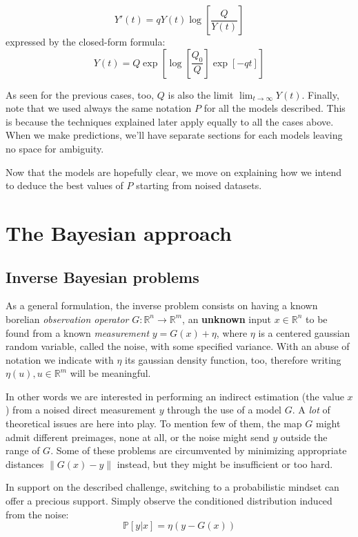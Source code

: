 \documentclass[9pt]{article}
\newcommand{\norm}[1]{\left\lVert#1\right\rVert}
\begin{document}
\begin{equation}
 Y'(t) = q Y(t) \log \left [\frac{Q} {Y(t)} \right ]
\end{equation}
expressed by the closed-form formula:
\begin{equation}
Y(t) = Q \exp	\left [
	\log \left [ \frac{Q_0}{Q} \right ]
	\exp \left [ -q t \right ]
		\right ]
\end{equation} 


As seen for the previous cases, too, $Q$ is also the limit
$\lim_{t \to \infty} Y(t)$.
Finally, note that we used always the same notation $P$ for all the models
described. This is because the techniques explained later apply equally
to all the cases above. When we make predictions, we'll have separate sections
for each models leaving no space for ambiguity.


Now that the models are hopefully clear, we move on explaining how we
intend to deduce the best values of $P$ starting from noised datasets.

\section {The Bayesian approach}
\subsection {Inverse Bayesian problems}
As a general formulation, the inverse problem 
consists on having a known borelian \emph{observation operator}
$G: \mathbb{R}^n \to \mathbb{R}^m$, an \textbf{unknown} 
input $x \in \mathbb{R}^n$ to be found from
a known \emph{measurement} $y = G(x) + \eta$, where $\eta$ is a centered
gaussian random variable, called the noise, with some specified variance.
With an abuse of notation we indicate with $\eta$ its gaussian
density function, too, therefore writing 
$\eta(u), u \in \mathbb{R}^m$ will be meaningful.


In other words we are interested in performing an indirect estimation 
(the value $x$) from a noised direct measurement $y$
through the use of a model $G$.
A \emph{lot} of theoretical issues are here into play. To mention
few of them, the map $G$ might admit different preimages, none at all,
or the noise might send $y$ outside the range of $G$.
Some of these problems are circumvented by minimizing appropriate distances
$\norm{G(x) - y}$ instead, but they might be insufficient or too hard.


In support on the described challenge,
switching to a probabilistic mindset can offer a precious support.
Simply observe the conditioned distribution induced from the noise:
\begin{equation}
	\mathbb{P} [ y | x] = \eta(y - G(x))
\end{equation}
\end{document}
